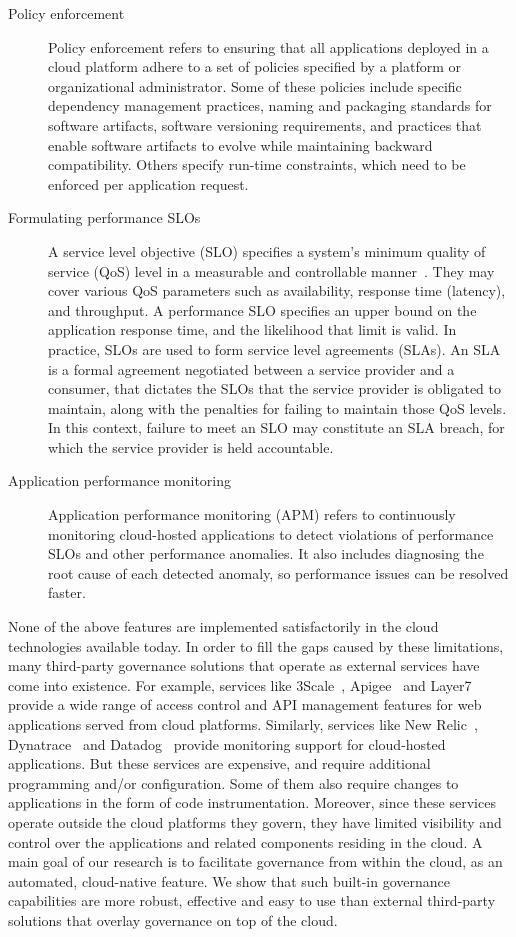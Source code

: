 \begin{description}
\item [Policy enforcement]
Policy enforcement refers to ensuring that all applications deployed in a cloud platform
adhere to a set of policies specified by a platform or organizational administrator.
Some of these policies include specific
dependency management practices, naming and packaging standards for software artifacts, 
software versioning requirements, and practices that enable software artifacts to evolve 
while maintaining backward compatibility.
Others specify run-time constraints, which need to be enforced per application request.

\item [Formulating performance SLOs]
A service level objective (SLO) specifies a system's minimum quality of service (QoS) level in a measurable and
controllable manner~\cite{smj2000}. They may cover various QoS
parameters such as availability, response time (latency), and throughput. A performance SLO
specifies an upper bound on the application response time, and the likelihood that limit is valid.
In practice, SLOs are used to form service level agreements (SLAs). An SLA is
a formal agreement negotiated between a service provider and a consumer, that dictates the SLOs 
that the service provider is obligated to maintain, along with the 
penalties for failing to maintain those QoS levels. In this context, failure to meet an SLO may
constitute an SLA breach, for which the service provider is held accountable.

\item [Application performance monitoring]
Application performance monitoring (APM) refers to continuously monitoring cloud-hosted applications
to detect violations of performance SLOs and other performance anomalies. 
It also includes diagnosing the root
cause of each detected anomaly, so performance issues can be resolved faster. 
\end{description}

None of the above features are implemented satisfactorily in the
cloud technologies available today.
In order to fill the gaps caused by these limitations, many third-party governance solutions that operate as external services
have come into existence. For example, services like 3Scale~\cite{3scale}, Apigee~\cite{apigee} and Layer7~\cite{layer7} provide a wide range
of access control and API management features for web applications served from cloud platforms. Similarly, 
services like New Relic~\cite{newrelic}, Dynatrace~\cite{dynatrace} and Datadog~\cite{datadog} provide monitoring support for cloud-hosted 
applications. But these services are expensive, and require additional programming and/or configuration.
Some of them also require changes to applications in the form of code instrumentation. Moreover,
since these services operate outside the cloud platforms they govern, they have limited visibility and control
over the applications and related components residing in the cloud. A main goal of our research is to facilitate governance
from within the cloud, as an automated, cloud-native feature. We show that such built-in governance capabilities are
more robust, effective and easy to use than external third-party solutions that overlay governance on top of the
cloud.

